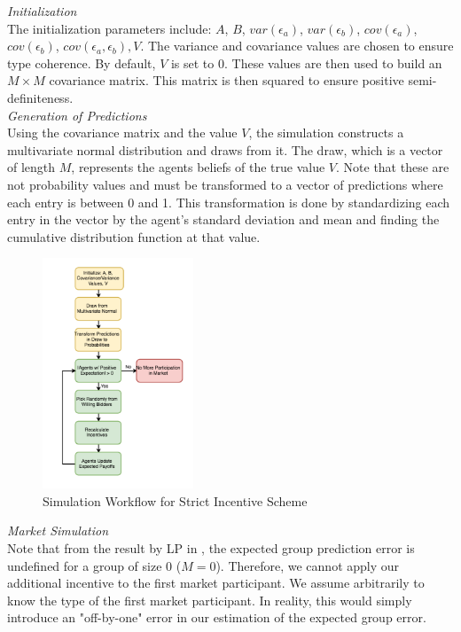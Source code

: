 \documentclass[twoside,twocolumn]{article}
\begin{document}
\textit{Initialization}\\

The initialization parameters include: $A$, $B$, $var(\epsilon_a)$, $var(\epsilon_b)$, $cov(\epsilon_a)$, $cov(\epsilon_b)$, $cov(\epsilon_a, \epsilon_b), V$. The variance and covariance values are chosen to ensure type coherence. By default, $V$ is set to 0. These values are then used to build an $M \times M$ covariance matrix. This matrix is then squared to ensure positive semi-definiteness.\\

\textit{Generation of Predictions}\\

Using the covariance matrix and the value $V$, the simulation constructs a multivariate normal distribution and draws from it. The draw, which is a vector of length $M$, represents the agents beliefs of the true value $V$. Note that these are not probability values and must be transformed to a vector of predictions where each entry is between 0 and 1. This transformation is done by standardizing each entry in the vector by the agent's standard deviation and mean and finding the cumulative distribution function at that value.

\begin{figure}[h]
\caption{Simulation Workflow for Strict Incentive Scheme}
\centering
\includegraphics[width=0.4\textwidth]{flow1}
\end{figure}

\textit{Market Simulation}\\

Note that from the result by LP in \cite{3}, the expected group prediction error is undefined for a group of size 0 ($M = 0$). Therefore, we cannot apply our additional incentive to the first market participant. We assume arbitrarily to know the type of the first market participant. In reality, this would simply introduce an "off-by-one" error in our estimation of the expected group error.\\
\end{document}
